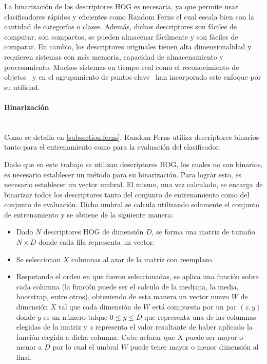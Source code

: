 	La binarización de los descriptores HOG es necesaria, ya que permite usar clasificadores rápidos y eficientes como Random Ferns el cual escala bien con la cantidad de categorías o clases. Además, dichos descriptores son fáciles de computar, son compactos, se pueden almacenar fácilmente y son fáciles de comparar. En cambio, los descriptores originales tienen alta dimensionalidad y requieren sistemas con más memoria, capacidad de almacenamiento y procesamiento. Muchos sistemas en tiempo real como el reconocimiento de objetos~\cite{SJC08} y en el agrupamiento de puntos clave~\cite{OFL07} han incorporado este enfoque por su utilidad.

	
	\paragraph{Binarización} ~\\
	
		Como se detalla en \ref{subsection:ferns}, Random Ferns utiliza descriptores binarios tanto para el entrenamiento como para la evaluación del clasificador.
		
		Dado que en este trabajo se utilizan descriptores HOG, los cuales no son binarios, es necesario establecer un método para su binarización. Para lograr esto, es necesario establecer un vector umbral. El mismo, una vez  calculado, se encarga de binarizar todos los descriptores tanto del conjunto de entrenamiento como del conjunto de evaluación. Dicho umbral se calcula utilizando solamente el conjunto de entrenamiento y se obtiene de la siguiente manera:
		
		\begin{itemize}
			\item Dado $N$ descriptores HOG de dimensión $D$, se forma una matriz de tamaño $N \times D$ donde cada fila representa un vector.
			\item Se seleccionan $X$ columnas al azar de la matriz con reemplazo.
			\item Respetando el orden en que fueron seleccionadas, se aplica una función sobre cada columna (la función puede ser el calculo de la mediana, la media, bootstrap, entre otros), obteniendo de esta manera un vector nuevo $W$ de dimensión $X$ tal que cada dimensión de $W$ está compuesta por un par $(z,y)$ donde $y$ es un número talque $0 \leq y \leq D$ que representa una de las columnas elegidas de la matriz y $z$ representa el valor resultante de haber aplicado la función elegida a dicha columna. Cabe aclarar que $X$ puede ser mayor o menor a $D$ por lo cual el umbral $W$ puede tener mayor o menor dimensión al final.
		\end{itemize}
		
